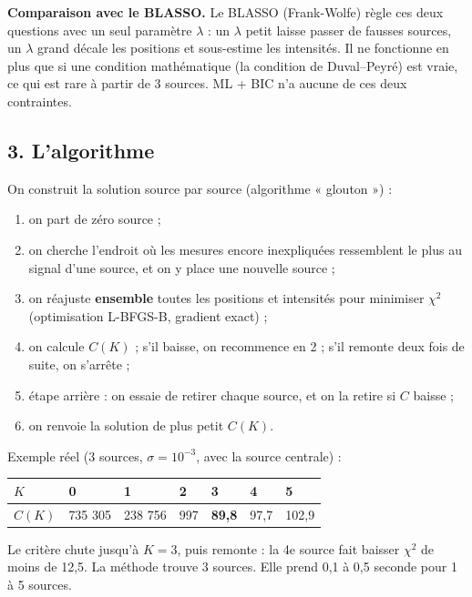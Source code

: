 \documentclass[
  french,
]{article}
\newcounter{none} %
\providecommand{\tightlist}{%
  \setlength{\itemsep}{0pt}\setlength{\parskip}{0pt}}
\begin{document}
\textbf{Comparaison avec le BLASSO.} Le BLASSO (Frank-Wolfe) règle ces
deux questions avec un seul paramètre \(\lambda\) : un \(\lambda\) petit
laisse passer de fausses sources, un \(\lambda\) grand décale les
positions et sous-estime les intensités. Il ne fonctionne en plus que si
une condition mathématique (la condition de Duval--Peyré) est vraie, ce
qui est rare à partir de 3 sources. ML + BIC n'a aucune de ces deux
contraintes.

\subsection{3. L'algorithme}\label{lalgorithme}

On construit la solution source par source (algorithme « glouton ») :

\begin{enumerate}
\def\labelenumi{\arabic{enumi}.}
\tightlist
\item
  on part de zéro source ;
\item
  on cherche l'endroit où les mesures encore inexpliquées ressemblent le
  plus au signal d'une source, et on y place une nouvelle source ;
\item
  on réajuste \textbf{ensemble} toutes les positions et intensités pour
  minimiser \(\chi^2\) (optimisation L-BFGS-B, gradient exact) ;
\item
  on calcule \(C(K)\) ; s'il baisse, on recommence en 2 ; s'il remonte
  deux fois de suite, on s'arrête ;
\item
  étape arrière : on essaie de retirer chaque source, et on la retire si
  \(C\) baisse ;
\item
  on renvoie la solution de plus petit \(C(K)\).
\end{enumerate}

Exemple réel (3 sources, \(\sigma = 10^{-3}\), avec la source centrale)
:

{\def\LTcaptype{none} %
\begin{longtable}[]{@{}lllllll@{}}
\toprule\noalign{}
\(K\) & 0 & 1 & 2 & \textbf{3} & 4 & 5 \\
\midrule\noalign{}
\endhead
\bottomrule\noalign{}
\endlastfoot
\(C(K)\) & 735 305 & 238 756 & 997 & \textbf{89,8} & 97,7 & 102,9 \\
\end{longtable}
}

Le critère chute jusqu'à \(K = 3\), puis remonte : la 4e source fait
baisser \(\chi^2\) de moins de 12,5. La méthode trouve 3 sources. Elle
prend 0,1 à 0,5 seconde pour 1 à 5 sources.
\end{document}
